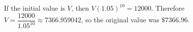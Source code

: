 If the initial value is $ V $, then $ V(1.05)^{10}=12000 $. Therefore $ V=\dfrac{12000}{1.05^{10}}\approx7366.959042 $, so the original value was $\boxed{\$ 7366.96}$.
